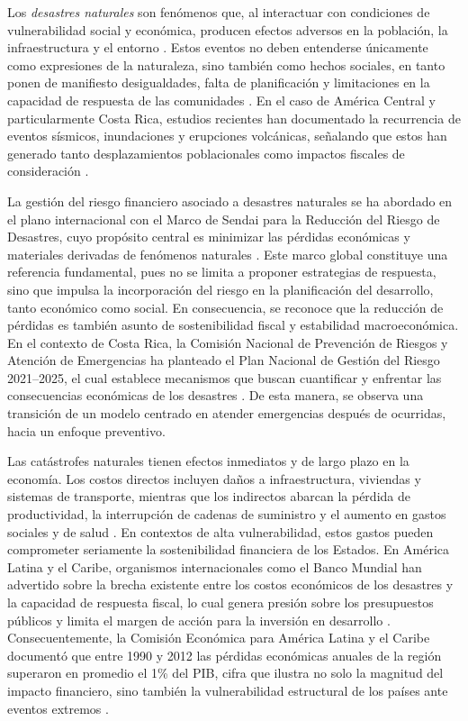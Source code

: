 \documentclass[12pt, a4paper]{article}
\begin{document}
Los \textit{desastres naturales} son fenómenos que, al interactuar con condiciones de vulnerabilidad social y económica, producen efectos adversos en la población, la infraestructura y el entorno \cite{Paniagua1995}. Estos eventos no deben entenderse únicamente como expresiones de la naturaleza, sino también como hechos sociales, en tanto ponen de manifiesto desigualdades, falta de planificación y limitaciones en la capacidad de respuesta de las comunidades \cite{PerezMallaina2005}. En el caso de América Central y particularmente Costa Rica, estudios recientes han documentado la recurrencia de eventos sísmicos, inundaciones y erupciones volcánicas, señalando que estos han generado tanto desplazamientos poblacionales como impactos fiscales de consideración \cite{CentenoMorales2017,OrozcoMontoya2022}.  

La gestión del riesgo financiero asociado a desastres naturales se ha abordado en el plano internacional con el Marco de Sendai para la Reducción del Riesgo de Desastres, cuyo propósito central es minimizar las pérdidas económicas y materiales derivadas de fenómenos naturales \cite{undrr2015}. Este marco global constituye una referencia fundamental, pues no se limita a proponer estrategias de respuesta, sino que impulsa la incorporación del riesgo en la planificación del desarrollo, tanto económico como social. En consecuencia, se reconoce que la reducción de pérdidas es también asunto de sostenibilidad fiscal y estabilidad macroeconómica. En el contexto de Costa Rica, la Comisión Nacional de Prevención de Riesgos y Atención de Emergencias ha planteado el Plan Nacional de Gestión del Riesgo 2021–2025, el cual establece mecanismos que buscan cuantificar y enfrentar las consecuencias económicas de los desastres \cite{cne2022}. De esta manera, se observa una transición de un modelo centrado en atender emergencias después de ocurridas, hacia un enfoque preventivo.  

Las catástrofes naturales tienen efectos inmediatos y de largo plazo en la economía. Los costos directos incluyen daños a infraestructura, viviendas y sistemas de transporte, mientras que los indirectos abarcan la pérdida de productividad, la interrupción de cadenas de suministro y el aumento en gastos sociales y de salud \cite{Paniagua1995}. En contextos de alta vulnerabilidad, estos gastos pueden comprometer seriamente la sostenibilidad financiera de los Estados. En América Latina y el Caribe, organismos internacionales como el Banco Mundial han advertido sobre la brecha existente entre los costos económicos de los desastres y la capacidad de respuesta fiscal, lo cual genera presión sobre los presupuestos públicos y limita el margen de acción para la inversión en desarrollo \cite[p. 23]{bancamundial2021}. Consecuentemente, la Comisión Económica para América Latina y el Caribe documentó que entre 1990 y 2012 las pérdidas económicas anuales de la región superaron en promedio el 1\% del PIB, cifra que ilustra no solo la magnitud del impacto financiero, sino también la vulnerabilidad estructural de los países ante eventos extremos \cite[p. 45]{cepal2014}.  
\end{document}

